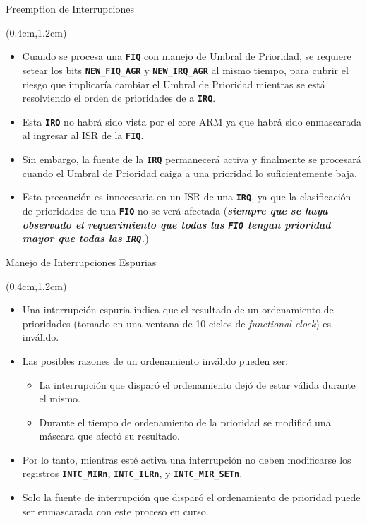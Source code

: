 \documentclass[usenames,table,xcolor={x11names},aspectratio=169]{beamer}
\begin{document}
\begin{frame}[t]{Preemption de Interrupciones}
 \begin{textblock*}{\textwidth}(0.4cm,1.2cm)
  \begin{itemize}[<+->]\justifying \parskip 0.2cm
   \item Cuando se procesa una \texttt{\textbf{FIQ}} con manejo de Umbral de Prioridad, se requiere setear  los bits \texttt{\textbf{NEW\_FIQ\_AGR}} y \texttt{\textbf{NEW\_IRQ\_AGR}} al mismo tiempo, para cubrir el riesgo que implicaría cambiar el Umbral de Prioridad mientras se está resolviendo el orden de prioridades de a \texttt{\textbf{IRQ}}.
   \item Esta \texttt{\textbf{IRQ}} no habrá sido vista por el core ARM ya que habrá sido enmascarada al ingresar al ISR de la \texttt{\textbf{FIQ}}.
   \item Sin embargo, la fuente de la \texttt{\textbf{IRQ}} permanecerá activa y finalmente se procesará cuando el Umbral de Prioridad caiga a una prioridad lo suficientemente baja.
   \item Esta precaución es innecesaria en un ISR de una \texttt{\textbf{IRQ}}, ya que la clasificación de prioridades de una \texttt{\textbf{FIQ}} no se verá afectada (\textbf{\textit{siempre que se haya observado el requerimiento que todas las \textbf{\texttt{FIQ}} tengan prioridad mayor que todas las \texttt{\textbf{IRQ}}.}})
  \end{itemize}
 \end{textblock*}
\end{frame}

\begin{frame}[t]{Manejo de Interrupciones Espurias}
 \begin{textblock*}{\textwidth}(0.4cm,1.2cm)
  \begin{itemize}[<+(1)->]\justifying \parskip 0.2cm
   \item Una interrupción espuria indica que el resultado de un ordenamiento de prioridades (tomado en una ventana de 10 ciclos de \textit{functional clock}) es inválido.
   \item Las posibles razones de un ordenamiento inválido pueden ser:
   \begin{itemize}
    \item La interrupción que disparó el ordenamiento dejó de estar válida durante el mismo.
    \item Durante el tiempo de ordenamiento de la prioridad se modificó una máscara que afectó su resultado.
   \end{itemize}
   \item Por lo tanto, mientras esté activa una interrupción no deben modificarse los registros \texttt{\textbf{INTC\_MIRn}}, \texttt{\textbf{INTC\_ILRn}}, y \texttt{\textbf{INTC\_MIR\_SETn}}.
   \item Solo la fuente de interrupción que disparó el ordenamiento de prioridad puede ser enmascarada con este proceso en curso.
  \end{itemize}
 \end{textblock*}
\end{frame}
\end{document}
